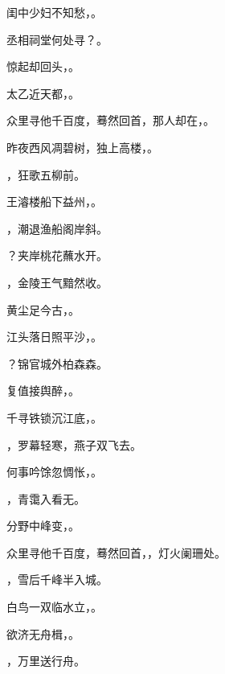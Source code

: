 \documentclass[12pt, a4paper, addpoints]{exam}
\begin{document}
\begin{questions}
\question[2] 闺中少妇不知愁，\uline{\qquad\qquad\qquad\qquad}。

\question[2] 丞相祠堂何处寻？\uline{\qquad\qquad\qquad\qquad}。

\question[2] 惊起却回头，\uline{\qquad\qquad\qquad\qquad}。

\question[2] 太乙近天都，\uline{\qquad\qquad\qquad\qquad}。

\question[2] 众里寻他千百度，蓦然回首，那人却在，\uline{\qquad\qquad\qquad\qquad}。

\question[2] 昨夜西风凋碧树，独上高楼，\uline{\qquad\qquad\qquad\qquad}。

\question[2] \uline{\qquad\qquad\qquad\qquad}，狂歌五柳前。

\question[2] 王濬楼船下益州，\uline{\qquad\qquad\qquad\qquad}。

\question[2] \uline{\qquad\qquad\qquad\qquad}，潮退渔船阁岸斜。

\question[2] \uline{\qquad\qquad\qquad\qquad}？夹岸桃花蘸水开。

\question[2] \uline{\qquad\qquad\qquad\qquad}，金陵王气黯然收。

\question[2] 黄尘足今古，\uline{\qquad\qquad\qquad\qquad}。

\question[2] 江头落日照平沙，\uline{\qquad\qquad\qquad\qquad}。

\question[2] \uline{\qquad\qquad\qquad\qquad}？锦官城外柏森森。

\question[2] 复值接舆醉，\uline{\qquad\qquad\qquad\qquad}。

\question[2] 千寻铁锁沉江底，\uline{\qquad\qquad\qquad\qquad}。

\question[2] \uline{\qquad\qquad\qquad\qquad}，罗幕轻寒，燕子双飞去。

\question[2] 何事吟馀忽惆怅，\uline{\qquad\qquad\qquad\qquad}。

\question[2] \uline{\qquad\qquad\qquad\qquad}，青霭入看无。

\question[2] 分野中峰变，\uline{\qquad\qquad\qquad\qquad}。

\question[2] 众里寻他千百度，蓦然回首，\uline{\qquad\qquad\qquad\qquad}，灯火阑珊处。

\question[2] \uline{\qquad\qquad\qquad\qquad}，雪后千峰半入城。

\question[2] 白鸟一双临水立，\uline{\qquad\qquad\qquad\qquad}。

\question[2] 欲济无舟楫，\uline{\qquad\qquad\qquad\qquad}。

\question[2] \uline{\qquad\qquad\qquad\qquad}，万里送行舟。

\end{questions}
\end{document}
